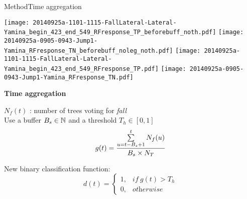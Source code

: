 \begin{frame}{Method}{Time aggregation}

\centering
\begin{minipage}[t]{0.7\linewidth}
    \centering
    \vspace{0pt}
    \renewcommand{\ratio}{0.5}
    \begin{overprint}
        
        \centering\texttt{[image: 20140925a-1101-1115-FallLateral-Lateral-Yamina\_begin\_423\_end\_549\_RFresponse\_TP\_beforebuff\_noth.pdf]}
        \texttt{[image: 20140925a-0905-0943-Jump1-Yamina\_RFresponse\_TN\_beforebuff\_noleg\_noth.pdf]}
        \centering\texttt{[image: 20140925a-1101-1115-FallLateral-Lateral-Yamina\_begin\_423\_end\_549\_RFresponse\_TP.pdf]}
        \texttt{[image: 20140925a-0905-0943-Jump1-Yamina\_RFresponse\_TN.pdf]}
    \end{overprint}

\end{minipage}

    \pause
    \medskip
    \centering\textbf{Time aggregation}
    
    \raggedright
    
    \centering
    \begin{minipage}[t]{0.42\linewidth}
        \vspace{0pt}
        $N_f(t)$ : number of trees voting for \emph{fall}\\
        Use a buffer $B_s \in \mathbb{N}$ and a threshold $T_h \in [0, 1]$
        \begin{equation*}
        g(t) = \frac{\sum\limits_{u=t-B_{s}+1}^{t}N_{f}(u)}{B_{s}\times N_{T}}\\
        \end{equation*}
    \end{minipage}\hspace{0.2cm}
    \begin{minipage}[t]{0.42\linewidth}
        \vspace{0pt}
        New binary classification function:
        \begin{equation*}
        d(t) = 
        \begin{cases}
        1, & \textit{if}\ g(t) > T_{h} \\
        0, & \textit{otherwise}
        \end{cases}
        \end{equation*}
    \end{minipage}

\end{frame}

